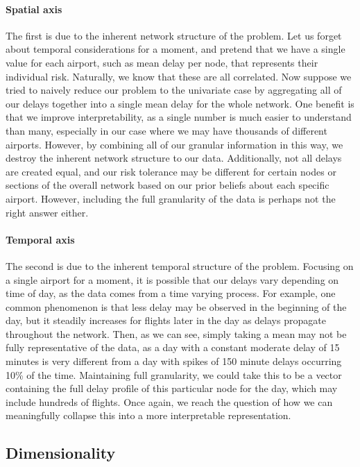 \paragraph{Spatial axis} The first is due to the inherent network structure of the problem. Let us forget about temporal considerations for a moment, and pretend that we have a single value for each airport, such as mean delay per node, that represents their individual risk. Naturally, we know that these are all correlated. Now suppose we tried to naively reduce our problem to the univariate case by aggregating all of our delays together into a single mean delay for the whole network. One benefit is that we improve interpretability, as a single number is much easier to understand than many, especially in our case where we may have thousands of different airports. However, by combining all of our granular information in this way, we destroy the inherent network structure to our data. Additionally, not all delays are created equal, and our risk tolerance may be different for certain nodes or sections of the overall network based on our prior beliefs about each specific airport. However, including the full granularity of the data is perhaps not the right answer either.

\paragraph{Temporal axis} The second is due to the inherent temporal structure of the problem. Focusing on a single airport for a moment, it is possible that our delays vary depending on time of day, as the data comes from a time varying process. For example, one common phenomenon is that less delay may be observed in the beginning of the day, but it steadily increases for flights later in the day as delays propagate throughout the network. Then, as we can see, simply taking a mean may not be fully representative of the data, as a day with a constant moderate delay of 15 minutes is very different from a day with spikes of 150 minute delays occurring 10\% of the time. Maintaining full granularity, we could take this to be a vector containing the full delay profile of this particular node for the day, which may include hundreds of flights. Once again, we reach the question of how we can meaningfully collapse this into a more interpretable representation.

\subsection{Dimensionality}

